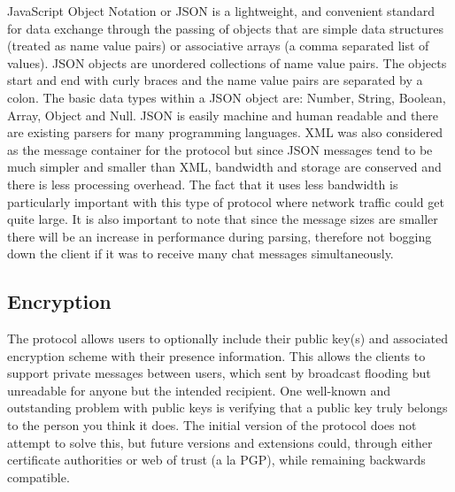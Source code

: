 \documentclass{article}
\begin{document}
JavaScript Object Notation or JSON is a lightweight, and convenient standard for
data exchange through the passing of objects that are simple data structures
(treated as name value pairs) or associative arrays (a comma separated list of
values).  JSON objects are unordered collections of name value pairs.  The
objects start and end with curly braces and the name value pairs are separated
by a colon.  The basic data types within a JSON object are: Number, String,
Boolean, Array, Object and Null.  JSON is easily machine and human readable and
there are existing parsers for many programming languages. XML was also
considered as the message container for the protocol but since JSON messages
tend to be much simpler and smaller than XML, bandwidth and storage are
conserved and there is less processing overhead.  The fact that it uses less
bandwidth is particularly important with this type of protocol where network
traffic could get quite large. It is also important to note that since the
message sizes are smaller there will be an increase in performance during
parsing, therefore not bogging down the client if it was to receive many chat
messages simultaneously.

\subsection{Encryption}

The protocol allows users to optionally include their public key(s) and
associated encryption scheme with their presence information. This allows the
clients to support private messages between users, which sent by broadcast
flooding but unreadable for anyone but the intended recipient. One well-known
and outstanding problem with public keys is verifying that a public key truly
belongs to the person you think it does. The initial version of the protocol
does not attempt to solve this, but future versions and extensions could,
through either certificate authorities or web of trust (a la PGP), while
remaining backwards compatible.
\end{document}
